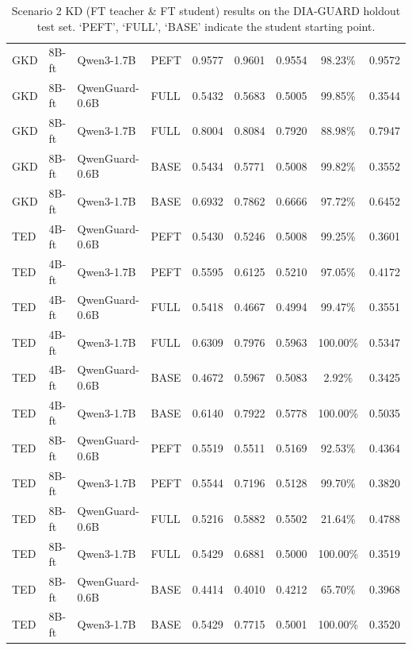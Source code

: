 \begin{table}[t]
\begin{tabular}{llllccccc}
GKD & 8B-ft & Qwen3-1.7B & PEFT & 0.9577 & 0.9601 & 0.9554 & 98.23\% & 0.9572 \\
GKD & 8B-ft & QwenGuard-0.6B & FULL & 0.5432 & 0.5683 & 0.5005 & 99.85\% & 0.3544 \\
GKD & 8B-ft & Qwen3-1.7B & FULL & 0.8004 & 0.8084 & 0.7920 & 88.98\% & 0.7947 \\
GKD & 8B-ft & QwenGuard-0.6B & BASE & 0.5434 & 0.5771 & 0.5008 & 99.82\% & 0.3552 \\
GKD & 8B-ft & Qwen3-1.7B & BASE & 0.6932 & 0.7862 & 0.6666 & 97.72\% & 0.6452 \\
TED & 4B-ft & QwenGuard-0.6B & PEFT & 0.5430 & 0.5246 & 0.5008 & 99.25\% & 0.3601 \\
TED & 4B-ft & Qwen3-1.7B & PEFT & 0.5595 & 0.6125 & 0.5210 & 97.05\% & 0.4172 \\
TED & 4B-ft & QwenGuard-0.6B & FULL & 0.5418 & 0.4667 & 0.4994 & 99.47\% & 0.3551 \\
TED & 4B-ft & Qwen3-1.7B & FULL & 0.6309 & 0.7976 & 0.5963 & 100.00\% & 0.5347 \\
TED & 4B-ft & QwenGuard-0.6B & BASE & 0.4672 & 0.5967 & 0.5083 & 2.92\% & 0.3425 \\
TED & 4B-ft & Qwen3-1.7B & BASE & 0.6140 & 0.7922 & 0.5778 & 100.00\% & 0.5035 \\
TED & 8B-ft & QwenGuard-0.6B & PEFT & 0.5519 & 0.5511 & 0.5169 & 92.53\% & 0.4364 \\
TED & 8B-ft & Qwen3-1.7B & PEFT & 0.5544 & 0.7196 & 0.5128 & 99.70\% & 0.3820 \\
TED & 8B-ft & QwenGuard-0.6B & FULL & 0.5216 & 0.5882 & 0.5502 & 21.64\% & 0.4788 \\
TED & 8B-ft & Qwen3-1.7B & FULL & 0.5429 & 0.6881 & 0.5000 & 100.00\% & 0.3519 \\
TED & 8B-ft & QwenGuard-0.6B & BASE & 0.4414 & 0.4010 & 0.4212 & 65.70\% & 0.3968 \\
TED & 8B-ft & Qwen3-1.7B & BASE & 0.5429 & 0.7715 & 0.5001 & 100.00\% & 0.3520 \\
\bottomrule
\end{tabular}
\caption{Scenario 2 KD (FT teacher \& FT student) results on the DIA-GUARD holdout test set. `PEFT', `FULL', `BASE' indicate the student starting point.}
\label{tab:kd_scenario2}
\end{table}